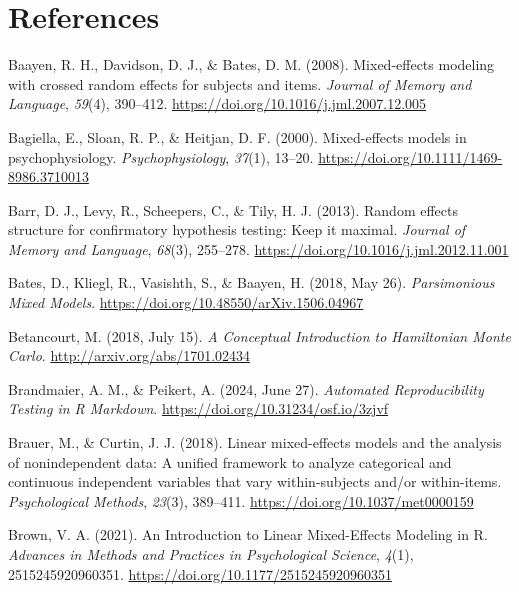 \documentclass[
  doc,12pt,floatsintext]{apa7}
\newlength{\cslhangindent}
\newenvironment{CSLReferences}[2] %
 {\begin{list}{}{%
  \setlength{\itemindent}{0pt}
  \setlength{\leftmargin}{0pt}
  \setlength{\parsep}{0pt}
  \ifodd #1
   \setlength{\leftmargin}{\cslhangindent}
   \setlength{\itemindent}{-1\cslhangindent}
  \fi
  \setlength{\itemsep}{#2\baselineskip}}}
 {\end{list}}
\begin{document}
\newpage

\section{References}\label{references}

\label{refs}
\begin{CSLReferences}{1}{0}
Baayen, R. H., Davidson, D. J., \& Bates, D. M. (2008). Mixed-effects modeling with crossed random effects for subjects and items. \emph{Journal of Memory and Language}, \emph{59}(4), 390--412. \url{https://doi.org/10.1016/j.jml.2007.12.005}

Bagiella, E., Sloan, R. P., \& Heitjan, D. F. (2000). Mixed-effects models in psychophysiology. \emph{Psychophysiology}, \emph{37}(1), 13--20. \url{https://doi.org/10.1111/1469-8986.3710013}

Barr, D. J., Levy, R., Scheepers, C., \& Tily, H. J. (2013). Random effects structure for confirmatory hypothesis testing: {Keep} it maximal. \emph{Journal of Memory and Language}, \emph{68}(3), 255--278. \url{https://doi.org/10.1016/j.jml.2012.11.001}

Bates, D., Kliegl, R., Vasishth, S., \& Baayen, H. (2018, May 26). \emph{Parsimonious {Mixed Models}}. \url{https://doi.org/10.48550/arXiv.1506.04967}

Betancourt, M. (2018, July 15). \emph{A {Conceptual Introduction} to {Hamiltonian Monte Carlo}}. \url{http://arxiv.org/abs/1701.02434}

Brandmaier, A. M., \& Peikert, A. (2024, June 27). \emph{Automated {Reproducibility Testing} in {R Markdown}}. \url{https://doi.org/10.31234/osf.io/3zjvf}

Brauer, M., \& Curtin, J. J. (2018). Linear mixed-effects models and the analysis of nonindependent data: {A} unified framework to analyze categorical and continuous independent variables that vary within-subjects and/or within-items. \emph{Psychological Methods}, \emph{23}(3), 389--411. \url{https://doi.org/10.1037/met0000159}

Brown, V. A. (2021). An {Introduction} to {Linear Mixed-Effects Modeling} in {R}. \emph{Advances in Methods and Practices in Psychological Science}, \emph{4}(1), 2515245920960351. \url{https://doi.org/10.1177/2515245920960351}


\end{CSLReferences}
\end{document}

